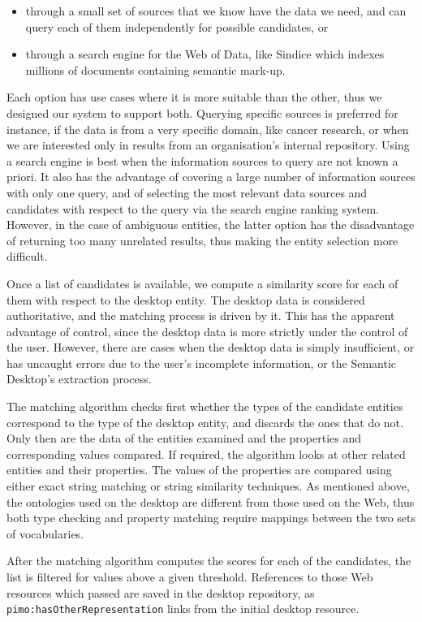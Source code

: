 \begin{itemize} 
\item through a small set of sources that we know have the data we need, and can query each of them independently for possible candidates, or 
\item through a search engine for the Web of Data, like Sindice \cite{Tummarello2007} which indexes millions of documents containing semantic mark-up.
\end{itemize}
Each option has use cases where it is more suitable than the other, thus we designed our system to support both. Querying specific sources is preferred for instance, if the data is from a very specific domain, like cancer research, or when we are interested only in results from an organisation's internal repository. Using a search engine is best when the information sources to query are not known a priori. It also has the advantage of covering a large number of information sources with only one query, and of selecting the most relevant data sources and candidates with respect to the query via the search engine ranking system. However, in the case of ambiguous entities, the latter option has the disadvantage of returning too many unrelated results, thus making the entity selection more difficult.

Once a list of candidates is available, we compute a similarity score for each of them with respect to the desktop entity. The desktop data is considered authoritative, and the matching process is driven by it. This has the apparent advantage of control, since the desktop data is more strictly under the control of the user. However, there are cases when the desktop data is simply insufficient, or has uncaught errors due to the user's incomplete information, or the Semantic Desktop's extraction process.

The matching algorithm checks first whether the types of the candidate entities correspond to the type of the desktop entity, and discards the ones that do not.
Only then are the data of the entities examined and the properties and corresponding values compared. If required, the algorithm looks at other related entities and their properties. The values of the properties are compared using either exact string matching or string similarity techniques. As mentioned above, the ontologies used on the desktop are different from those used on the Web, thus both type checking and property matching require mappings between the two sets of vocabularies.

After the matching algorithm computes the scores for each of the candidates, the list is filtered for values above a given threshold. References to those Web resources which passed are saved in the desktop repository, as \verb|pimo:hasOtherRepresentation| links from the initial desktop resource.
